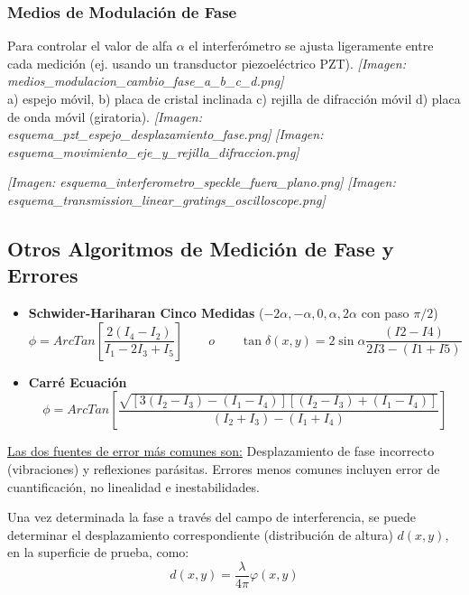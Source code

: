 \documentclass[12pt]{article}
\begin{document}
	\subsubsection*{Medios de Modulación de Fase}
	Para controlar el valor de alfa $\alpha$ el interferómetro se ajusta ligeramente entre cada medición (ej. usando un transductor piezoeléctrico PZT).
	\textit{[Imagen: medios\_modulacion\_cambio\_fase\_a\_b\_c\_d.png]} \\
	a) espejo móvil, b) placa de cristal inclinada c) rejilla de difracción móvil d) placa de onda móvil (giratoria).
	\textit{[Imagen: esquema\_pzt\_espejo\_desplazamiento\_fase.png]}
	\textit{[Imagen: esquema\_movimiento\_eje\_y\_rejilla\_difraccion.png]}
	
	\textit{[Imagen: esquema\_interferometro\_speckle\_fuera\_plano.png]}
	\textit{[Imagen: esquema\_transmission\_linear\_gratings\_oscilloscope.png]}
	
	\subsection{Otros Algoritmos de Medición de Fase y Errores}
	\begin{itemize}
		\item \textbf{Schwider-Hariharan Cinco Medidas} ($-2\alpha, -\alpha, 0, \alpha, 2\alpha$ con paso $\pi/2$)
		\begin{equation*}
			\phi = ArcTan \left[ \frac{2(I_4 - I_2)}{I_1 - 2I_3 + I_5} \right] \qquad o \qquad \tan \delta(x, y) = 2 \sin \alpha \frac{(I2 - I4)}{2I3 - (I1 + I5)}
		\end{equation*}
		\item \textbf{Carré Ecuación}
		\begin{equation*}
			\phi = ArcTan \left[ \frac{\sqrt{[3(I_2 - I_3) - (I_1 - I_4)][(I_2 - I_3) + (I_1 - I_4)]}}{(I_2 + I_3) - (I_1 + I_4)} \right]
		\end{equation*}
	\end{itemize}
	
	\underline{Las dos fuentes de error más comunes son:} Desplazamiento de fase incorrecto (vibraciones) y reflexiones parásitas. Errores menos comunes incluyen error de cuantificación, no linealidad e inestabilidades.
	
	Una vez determinada la fase a través del campo de interferencia, se puede determinar el desplazamiento correspondiente (distribución de altura) $d(x,y)$, en la superficie de prueba, como:
	\begin{equation*}
		d(x,y) = \frac{\lambda}{4\pi} \varphi(x,y)
	\end{equation*}
	
\end{document}
